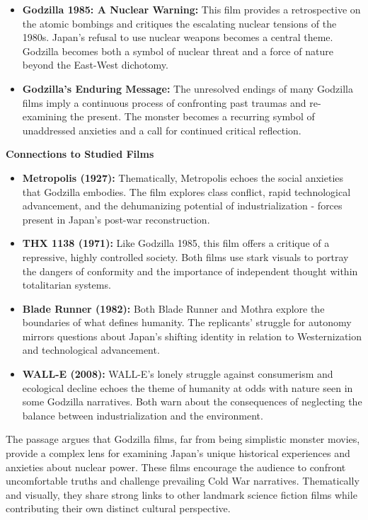 \documentclass[11pt,fleqn]{book}
\begin{document}
\begin{itemize}
\item \textbf{Godzilla 1985: A Nuclear Warning:}  This film provides a retrospective on the atomic bombings and critiques the escalating nuclear tensions of the 1980s. Japan's refusal to use nuclear weapons becomes a central theme. Godzilla becomes both a symbol of nuclear threat and a force of nature beyond the East-West dichotomy.

\item \textbf{Godzilla's Enduring Message:} The unresolved endings of many Godzilla films imply a continuous process of confronting past traumas and re-examining the present. The monster becomes a recurring symbol of unaddressed anxieties and a call for continued critical reflection. 
\end{itemize}
\vspace{5pt}

\textbf{Connections to Studied Films}

\begin{itemize}
\item \textbf{Metropolis (1927):} Thematically, Metropolis echoes the social anxieties that Godzilla embodies. The film explores class conflict, rapid technological advancement, and the dehumanizing potential of industrialization - forces present in Japan's post-war reconstruction.  

\item \textbf{THX 1138 (1971):}  Like Godzilla 1985, this film offers a critique of a repressive, highly controlled society. Both films use stark visuals to portray the dangers of conformity and the importance of independent thought within totalitarian systems.

\item \textbf{Blade Runner (1982):}  Both Blade Runner and Mothra explore the boundaries of what defines humanity. The replicants' struggle for autonomy mirrors questions about Japan's shifting identity in relation to Westernization and technological advancement. 

\item \textbf{WALL-E (2008):}   WALL-E's lonely struggle against consumerism and ecological decline echoes the theme of humanity at odds with nature seen in some Godzilla narratives. Both warn about the consequences of neglecting the balance between industrialization and the environment.
\end{itemize}

\vspace{5pt}

The passage argues that Godzilla films, far from being simplistic monster movies, provide a complex lens for examining Japan's unique historical experiences and anxieties about nuclear power. These films encourage the audience to confront uncomfortable truths and challenge prevailing Cold War narratives. Thematically and visually, they share strong links to other landmark science fiction films while contributing their own distinct cultural perspective. 
\end{document}
